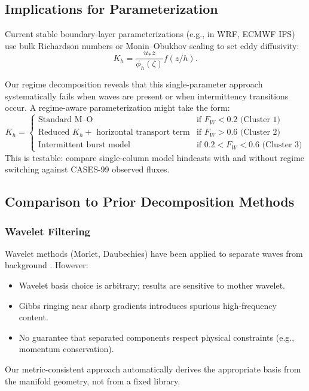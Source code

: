 \documentclass[11pt,a4paper]{article}
\begin{document}
\subsection{Implications for Parameterization}

Current stable boundary-layer parameterizations (e.g., in WRF, ECMWF IFS) use bulk Richardson numbers or Monin--Obukhov scaling to set eddy diffusivity:
\begin{equation}
K_h = \frac{u_* z}{\phi_h(\zeta)} f(z/h).
\end{equation}

Our regime decomposition reveals that this single-parameter approach systematically fails when waves are present or when intermittency transitions occur. A regime-aware parameterization might take the form:
\begin{equation}
K_h = \begin{cases}
\text{Standard M--O} & \text{if } F_W < 0.2 \text{ (Cluster 1)} \\
\text{Reduced } K_h + \text{ horizontal transport term} & \text{if } F_W > 0.6 \text{ (Cluster 2)} \\
\text{Intermittent burst model} & \text{if } 0.2 < F_W < 0.6 \text{ (Cluster 3)}
\end{cases}
\end{equation}
This is testable: compare single-column model hindcasts with and without regime switching against CASES-99 observed fluxes.

\subsection{Comparison to Prior Decomposition Methods}

\subsubsection{Wavelet Filtering}

Wavelet methods (Morlet, Daubechies) have been applied to separate waves from background \citep{Vosper2006, Sun2015}. However:
\begin{itemize}
  \item Wavelet basis choice is arbitrary; results are sensitive to mother wavelet.
  \item Gibbs ringing near sharp gradients introduces spurious high-frequency content.
  \item No guarantee that separated components respect physical constraints (e.g., momentum conservation).
\end{itemize}
Our metric-consistent approach automatically derives the appropriate basis from the manifold geometry, not from a fixed library.
\end{document}
